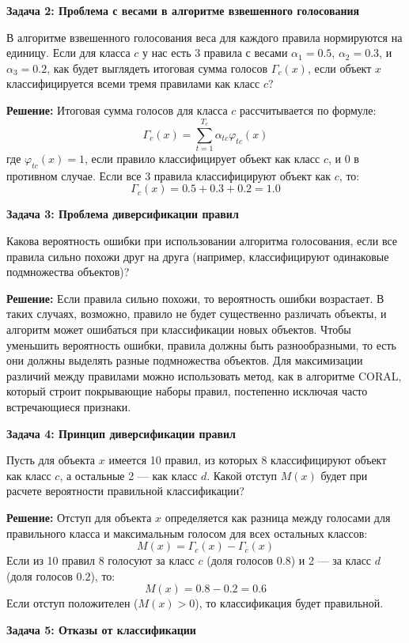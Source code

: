 \textbf{Задача 2: Проблема с весами в алгоритме взвешенного голосования}

В алгоритме взвешенного голосования веса для каждого правила нормируются на единицу. Если для класса $c$ у нас есть 3 правила с весами $\alpha_1 = 0.5$, $\alpha_2 = 0.3$, и $\alpha_3 = 0.2$, как будет выглядеть итоговая сумма голосов $\Gamma_c(x)$, если объект $x$ классифицируется всеми тремя правилами как класс $c$?

\textbf{Решение:}  
Итоговая сумма голосов для класса $c$ рассчитывается по формуле:
\[
\Gamma_c(x) = \sum_{t=1}^{T_c} \alpha_{tc} \varphi_{tc}(x)
\]
где $\varphi_{tc}(x) = 1$, если правило классифицирует объект как класс $c$, и 0 в противном случае. Если все 3 правила классифицируют объект как $c$, то:
\[
\Gamma_c(x) = 0.5 + 0.3 + 0.2 = 1.0
\]

\textbf{Задача 3: Проблема диверсификации правил}

Какова вероятность ошибки при использовании алгоритма голосования, если все правила сильно похожи друг на друга (например, классифицируют одинаковые подмножества объектов)?

\textbf{Решение:}  
Если правила сильно похожи, то вероятность ошибки возрастает. В таких случаях, возможно, правило не будет существенно различать объекты, и алгоритм может ошибаться при классификации новых объектов. Чтобы уменьшить вероятность ошибки, правила должны быть разнообразными, то есть они должны выделять разные подмножества объектов. Для максимизации различий между правилами можно использовать метод, как в алгоритме CORAL, который строит покрывающие наборы правил, постепенно исключая часто встречающиеся признаки.

\textbf{Задача 4: Принцип диверсификации правил}

Пусть для объекта $x$ имеется 10 правил, из которых 8 классифицируют объект как класс $c$, а остальные 2 — как класс $d$. Какой отступ $M(x)$ будет при расчете вероятности правильной классификации?

\textbf{Решение:}  
Отступ для объекта $x$ определяется как разница между голосами для правильного класса и максимальным голосом для всех остальных классов:
\[
M(x) = \Gamma_c(x) - \Gamma_{\overline{c}}(x)
\]
Если из 10 правил 8 голосуют за класс $c$ (доля голосов $0.8$) и 2 — за класс $d$ (доля голосов $0.2$), то:
\[
M(x) = 0.8 - 0.2 = 0.6
\]
Если отступ положителен ($M(x) > 0$), то классификация будет правильной.

\textbf{Задача 5: Отказы от классификации}


